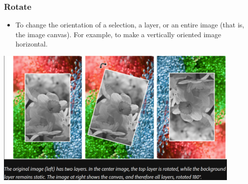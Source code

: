\documentclass{beamer}
\begin{document}
\begin{frame}
	\frametitle{Rotate}
	\begin{itemize}
		\item To change the orientation of a selection, a layer, or an entire image (that is, the image canvas). For example, to make a vertically oriented image horizontal.
\end{itemize}
\begin{center}
	\includegraphics[width = 0.9\textwidth]{images/rotate.png}
	\end{center}
\end{frame}
\end{document}
